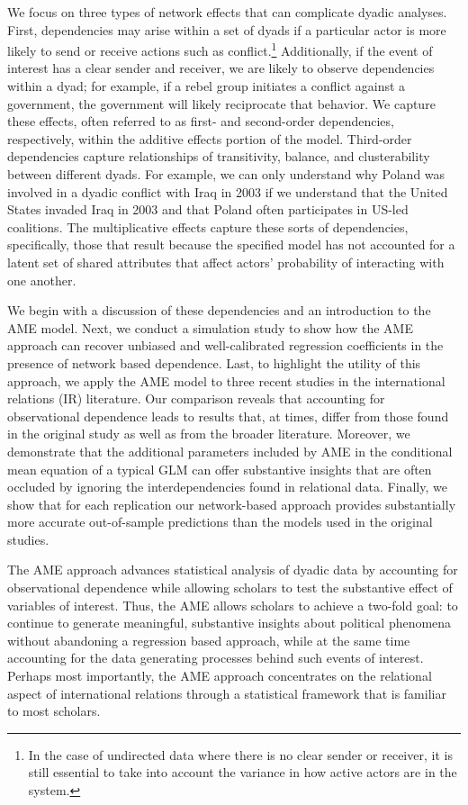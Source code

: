 \documentclass[12pt]{amsart}
\begin{document}
We focus on three types of network effects that can complicate dyadic analyses. First, dependencies may arise within a set of dyads if a particular actor is more likely to send or receive actions such as conflict.\footnote{In the case of undirected data where there is no clear sender or receiver, it is still essential to take into account the variance in how active actors are in the system.} Additionally, if the event of interest has a clear sender and receiver, we are likely to observe dependencies within a dyad; for example, if a rebel group initiates a conflict against a government, the government will likely reciprocate that behavior. We capture these effects, often referred to as first- and second-order dependencies, respectively, within the additive effects portion of the model. Third-order dependencies capture relationships of transitivity, balance, and clusterability between different dyads. For example, we can only understand why Poland was involved in a dyadic conflict with Iraq in 2003 if we understand that the United States invaded Iraq in 2003 and that Poland often participates in US-led coalitions. The multiplicative effects capture these sorts of dependencies, specifically, those that result because the specified model has not accounted for a latent set of shared attributes that affect actors' probability of interacting with one another.

We begin with a discussion of these dependencies and an introduction to the AME model. Next, we conduct a simulation study to show how the AME approach can recover unbiased and well-calibrated regression coefficients in the presence of network based dependence. Last, to highlight the utility of this approach, we apply the AME model to three recent studies in the international relations (IR) literature. Our comparison reveals that accounting for observational dependence leads to results that, at times, differ from those found in the original study as well as from the broader literature. Moreover, we demonstrate that the additional parameters included by AME in the conditional mean equation of a typical GLM can offer substantive insights that are often occluded by ignoring the interdependencies found in relational data. Finally, we show that for each replication our network-based approach provides substantially more accurate out-of-sample predictions than the models used in the original studies.

The AME approach advances statistical analysis of dyadic data by accounting for observational dependence while allowing scholars to test the substantive effect of variables of interest. Thus, the AME allows scholars to achieve a two-fold goal: to continue to generate meaningful, substantive insights about political phenomena without abandoning a regression based approach, while at the same time accounting for the data generating processes behind such events of interest. Perhaps most importantly, the AME approach concentrates on the relational aspect of international relations through a statistical framework that is familiar to most scholars.
\end{document}
